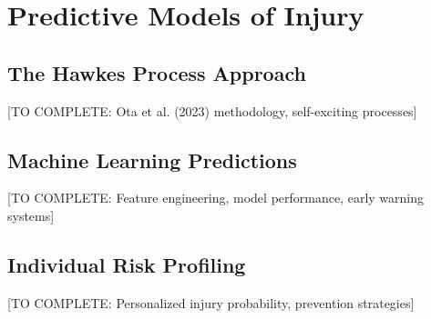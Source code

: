 \section{Predictive Models of Injury}

\subsection{The Hawkes Process Approach}

[TO COMPLETE: Ota et al. (2023) methodology, self-exciting processes]

\subsection{Machine Learning Predictions}

[TO COMPLETE: Feature engineering, model performance, early warning systems]

\subsection{Individual Risk Profiling}

[TO COMPLETE: Personalized injury probability, prevention strategies]